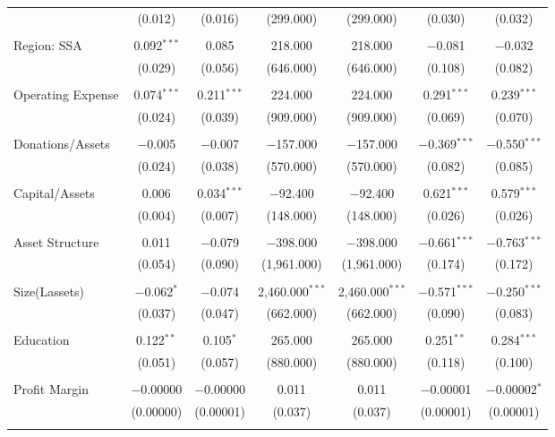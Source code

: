 \documentclass[a4paper,nobind]{templates/ociamthesis}
\begin{document}
\begin{landscape}
\begin{table}[!htbp]
\begin{tabular}{@{\extracolsep{5pt}}lcccccc}
  & (0.012) & (0.016) & (299.000) & (299.000) & (0.030) & (0.032) \\ 
  & & & & & & \\ 
 Region: SSA & 0.092$^{***}$ & 0.085 & 218.000 & 218.000 & $-$0.081 & $-$0.032 \\ 
  & (0.029) & (0.056) & (646.000) & (646.000) & (0.108) & (0.082) \\ 
  & & & & & & \\ 
 Operating Expense & 0.074$^{***}$ & 0.211$^{***}$ & 224.000 & 224.000 & 0.291$^{***}$ & 0.239$^{***}$ \\ 
  & (0.024) & (0.039) & (909.000) & (909.000) & (0.069) & (0.070) \\ 
  & & & & & & \\ 
 Donations/Assets & $-$0.005 & $-$0.007 & $-$157.000 & $-$157.000 & $-$0.369$^{***}$ & $-$0.550$^{***}$ \\ 
  & (0.024) & (0.038) & (570.000) & (570.000) & (0.082) & (0.085) \\ 
  & & & & & & \\ 
 Capital/Assets & 0.006 & 0.034$^{***}$ & $-$92.400 & $-$92.400 & 0.621$^{***}$ & 0.579$^{***}$ \\ 
  & (0.004) & (0.007) & (148.000) & (148.000) & (0.026) & (0.026) \\ 
  & & & & & & \\ 
 Asset Structure & 0.011 & $-$0.079 & $-$398.000 & $-$398.000 & $-$0.661$^{***}$ & $-$0.763$^{***}$ \\ 
  & (0.054) & (0.090) & (1,961.000) & (1,961.000) & (0.174) & (0.172) \\ 
  & & & & & & \\ 
 Size(Lassets) & $-$0.062$^{*}$ & $-$0.074 & 2,460.000$^{***}$ & 2,460.000$^{***}$ & $-$0.571$^{***}$ & $-$0.250$^{***}$ \\ 
  & (0.037) & (0.047) & (662.000) & (662.000) & (0.090) & (0.083) \\ 
  & & & & & & \\ 
 Education & 0.122$^{**}$ & 0.105$^{*}$ & 265.000 & 265.000 & 0.251$^{**}$ & 0.284$^{***}$ \\ 
  & (0.051) & (0.057) & (880.000) & (880.000) & (0.118) & (0.100) \\ 
  & & & & & & \\ 
 Profit Margin & $-$0.00000 & $-$0.00000 & 0.011 & 0.011 & $-$0.00001 & $-$0.00002$^{*}$ \\ 
  & (0.00000) & (0.00001) & (0.037) & (0.037) & (0.00001) & (0.00001) \\ 
  & & & & & & \\ 

\end{tabular}
\end{table}
\end{landscape}
\end{document}
